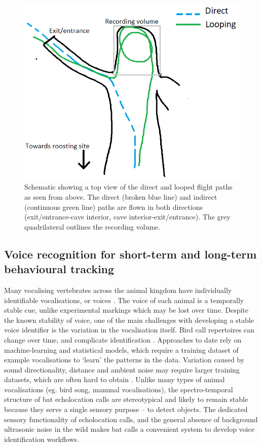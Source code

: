 \documentclass[
]{book}
\begin{document}
\begin{figure}
\includegraphics[width=1\linewidth]{original_papers/ushichka-figures/looping} \caption{Schematic showing a top view of the direct and looped flight paths as seen from above. The direct (broken blue line) and indirect (continuous green line) paths are flown in both directions (exit/entrance-cave interior, cave interior-exit/entrance). The grey quadrilateral outlines the recording volume.}\label{fig:loopingsch}
\end{figure}

\hypertarget{voice-recognition-for-short-term-and-long-term-behavioural-tracking}{%
\subsection{Voice recognition for short-term and long-term behavioural tracking}\label{voice-recognition-for-short-term-and-long-term-behavioural-tracking}}

Many vocalising vertebrates across the animal kingdom have individually identifiable vocalisations, or voices \citep{carlson2020individual}. The voice of each animal is a temporally stable cue, unlike experimental markings which may be lost over time. Despite the known stability of voice, one of the main challenges with developing a stable voice identifier is the variation in the vocalisation itself. Bird call repertoires can change over time, and complicate identification \citep{stowell2019automatic}. Approaches to date rely on machine-learning and statistical models, which require a training dataset of example vocalisations to `learn' the patterns in the data. Variation caused by sound directionality, distance and ambient noise may require larger training datasets, which are often hard to obtain \citep{stowell2019automatic}. Unlike many types of animal vocalisations (eg. bird song, mammal vocalisations), the spectro-temporal structure of bat echolocation calls are stereotypical and likely to remain stable because they serve a single sensory purpose -- to detect objects. The dedicated sensory functionality of echolocation calls, and the general absence of background ultrasonic noise in the wild makes bat calls a convenient system to develop voice identification workflows.
\end{document}
